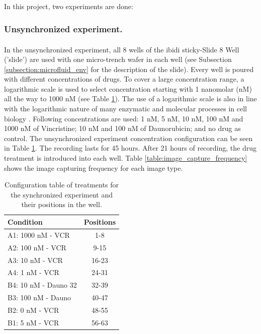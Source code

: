 \documentclass[pdftex,12pt,a4paper]{report}
\begin{document}
In this project, two experiments are done:

\subsubsection{Unsynchronized experiment.}

In the unsynchronized experiment, all 8 wells of the ibidi\textsuperscript{\textregistered} sticky-Slide 8 Well ('slide') are used with one micro-trench wafer in each well (see Subsection \ref{subsection:microfluid_env} for the description of the slide). Every well is poured with different concentrations of drugs. To cover a large concentration range, a logarithmic scale is used to select concentration starting with 1 nanomolar (nM) all the way to 1000 nM (see Table \ref{table:unsyn_treatments}). The use of a logarithmic scale is also in line with the logarithmic nature of many enzymatic and molecular processes in cell biology \cite{wilkinson1961statistical, savageau1969biochemical}. Following concentrations are used:  1 nM, 5 nM, 10 nM, 100 nM and 1000 nM of Vincristine; 10 nM and 100 nM of Daunorubicin; and no drug as control. The unsynchronized experiment concentration configuration can be seen in Table \ref{table:unsyn_treatments}. The recording lasts for 45 hours. After 21 hours of recording, the drug treatment is introduced into each well. Table \ref{table:image_capture_frequency} shows the image capturing frequency for each image type.

\begin{table}[H]
\centering
\begin{tabular}{ l | c }
\hline
Condition & Positions \\
\hline\hline
A1: 1000 nM - VCR & 1-8 \\
A2: 100 nM - VCR & 9-15 \\
A3: 10 nM - VCR & 16-23 \\
A4: 1 nM - VCR & 24-31 \\
B4: 10 nM - Dauno 32 & 32-39 \\
B3: 100 nM - Dauno & 40-47 \\
B2: 0 nM - VCR & 48-55 \\
B1: 5 nM - VCR & 56-63 \\
\hline
\end{tabular}
\caption{Configuration table of treatments for the synchronized experiment  and their positions in the well.}
\label{table:unsyn_treatments}
\end{table}
\end{document}
